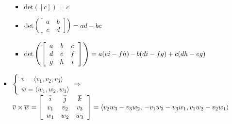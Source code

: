 \begin{itemize}
\begin{itemize}
\begin{itemize}
                \begin{itemize}

                  \item $\text{det}([c]) = c$

                  \item $\text{det}\left( \left[\begin{array}{c c} a & b \\ c & d \end{array}\right] \right) = ad - bc$

                  \item $\text{det}\left( \left[\begin{array}{c c c} a & b & c\\ d & e & f\\ g & h & i \end{array}\right] \right)= a(ei - fh)\, \textcolor{red}{-}\, b (di - fg) + c (dh - eg)$

                \end{itemize}

              \item $\left\{\begin{array}{c} \overline{v}=\langle v_1, v_2, v_3 \rangle \\ \overline{w}=\langle w_1, w_2, w_3 \rangle \end{array}\Rightarrow$\\$\overline{v}\times\overline{w} = \left[ \begin{array}{c c c} \overline{i} & \overline{j} & \overline{k}\\ v_1 & v_2 & v_3\\ w_1 & w_2 & w_3  \end{array} \right]= \langle v_2w_3-v_3w_2,\,\textcolor{red}{-}v_1w_3-v_3w_1,v_1w_2-v_2w_1\rangle$

          \end{itemize}

      \end{itemize}

\end{itemize}



